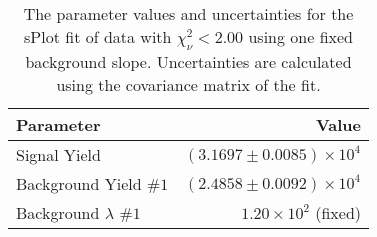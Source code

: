 
\begin{table}[ht]
    \begin{center}
        \begin{tabular}{lr}\toprule
            Parameter & Value \\\midrule
            Signal Yield & $(3.1697 \pm 0.0085) \times 10^{4}$ \\
            Background Yield $\#1$ & $(2.4858 \pm 0.0092) \times 10^{4}$ \\
            Background $\lambda$ $\#1$ & $1.20 \times 10^{2}$ (fixed) \\\bottomrule
        \end{tabular}
        \caption{The parameter values and uncertainties for the sPlot fit of data with $\chi^2_\nu < 2.00$ using one fixed background slope. Uncertainties are calculated using the covariance matrix of the fit.}\label{tab:splot-fit-results-chisqdof-2.00-fixed-1}
    \end{center}
\end{table}
